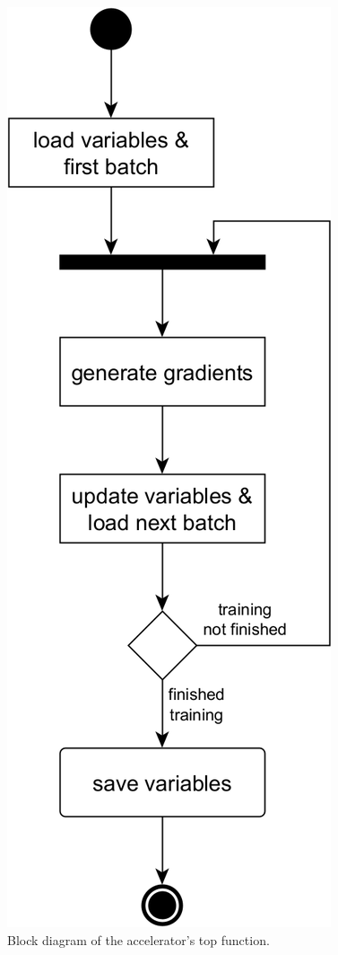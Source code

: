 \begin{figure}[H]
    \centering
        \includegraphics[height=0.5\textheight]{Images/block_diagrams/accel_top.png}
        \decoRule
        \caption[Top function]{Block diagram of the accelerator's top function.}
        \label{fig: top function}
\end{figure}
